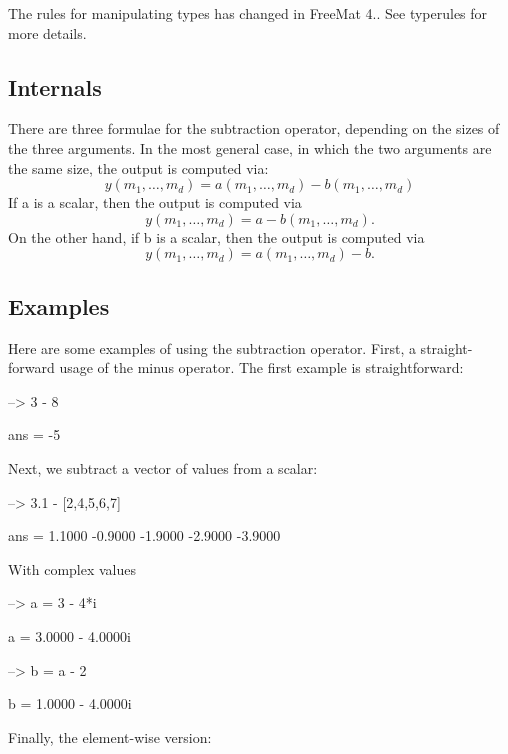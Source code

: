 The rules for manipulating types has changed in Free\-Mat 4.. See {\ttfamily typerules} for more details.\hypertarget{transforms_svd_Function}{}\subsection{Internals}\label{transforms_svd_Function}
There are three formulae for the subtraction operator, depending on the sizes of the three arguments. In the most general case, in which the two arguments are the same size, the output is computed via\-: \[ y(m_1,\ldots,m_d) = a(m_1,\ldots,m_d) - b(m_1,\ldots,m_d) \] If {\ttfamily a} is a scalar, then the output is computed via \[ y(m_1,\ldots,m_d) = a - b(m_1,\ldots,m_d). \] On the other hand, if {\ttfamily b} is a scalar, then the output is computed via \[ y(m_1,\ldots,m_d) = a(m_1,\ldots,m_d) - b. \] \hypertarget{variables_matrix_Examples}{}\subsection{Examples}\label{variables_matrix_Examples}
Here are some examples of using the subtraction operator. First, a straight-\/forward usage of the minus operator. The first example is straightforward\-:


\begin{DoxyVerbInclude}
--> 3 - 8

ans = 
 -5 
\end{DoxyVerbInclude}


Next, we subtract a vector of values from a scalar\-:


\begin{DoxyVerbInclude}
--> 3.1 - [2,4,5,6,7]

ans = 
    1.1000   -0.9000   -1.9000   -2.9000   -3.9000 
\end{DoxyVerbInclude}


With complex values


\begin{DoxyVerbInclude}
--> a = 3 - 4*i

a = 
   3.0000 -  4.0000i 

--> b = a - 2

b = 
   1.0000 -  4.0000i 
\end{DoxyVerbInclude}


Finally, the element-\/wise version\-:


